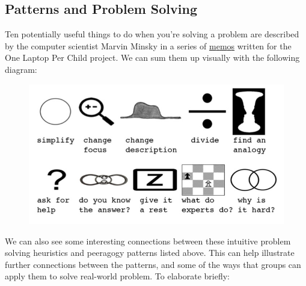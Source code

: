 \subsection{Patterns and Problem Solving}

Ten potentially useful things to do when you're solving a problem are
described by the computer scientist Marvin Minsky in a series of
\href{http://web.media.mit.edu/~minsky/OLPC-1.html}{m}\href{http://web.media.mit.edu/~minsky/OLPC-2.html}{e}\href{http://web.media.mit.edu/~minsky/OLPC-3.html}{m}\href{http://web.media.mit.edu/~minsky/OLPC-4.html}{o}\href{http://web.media.mit.edu/~minsky/OLPC-5.html}{s}
written for the One Laptop Per Child project. We can sum them up
visually with the following diagram:

\begin{figure}[htbp]
\centering
\includegraphics[width=\textwidth]{../pictures/heuristic-images.jpg}
\caption*{}
\end{figure}

We can also see some interesting connections between these intuitive
problem solving heuristics and peeragogy patterns listed above. This can
help illustrate further connections between the patterns, and some of
the ways that groups can apply them to solve real-world problem. To
elaborate briefly:

